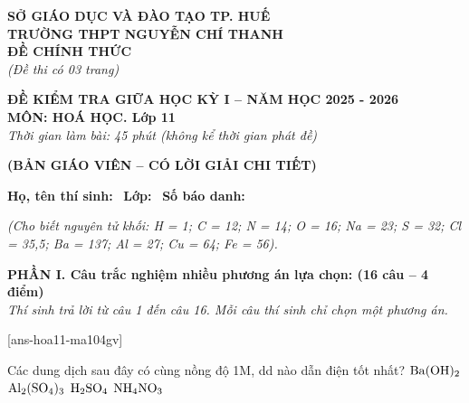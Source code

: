 \documentclass[12pt,a4paper]{article}
\begin{document}
\thispagestyle{firstpage}

\noindent
\begin{minipage}[t]{0.45\textwidth}
	\centering\fontsize{10pt}{12pt}\selectfont
	\textbf{SỞ GIÁO DỤC VÀ ĐÀO TẠO TP. HUẾ}\\
	\textbf{TRƯỜNG THPT NGUYỄN CHÍ THANH}\\
	\textbf{ĐỀ CHÍNH THỨC}\\
	\textit{(Đề thi có 03 trang)}
\end{minipage}\hfill
\begin{minipage}[t]{0.53\textwidth}
	\centering\small
	\textbf{ĐỀ KIỂM TRA GIỮA HỌC KỲ I -- NĂM HỌC 2025 - 2026}\\
	\textbf{MÔN: HOÁ HỌC. Lớp 11}\\
	\textit{Thời gian làm bài: 45 phút (không kể thời gian phát đề)}\\
\end{minipage}

\smallskip
\begin{center}
	{\color{hfRed}\textbf{\large (BẢN GIÁO VIÊN -- CÓ LỜI GIẢI CHI TIẾT)}}
\end{center}

\smallskip
\noindent\hrulefill
\smallskip

\noindent\textbf{Họ, tên thí sinh:} \dotfill\ \textbf{Lớp:} \dotfill\ \textbf{Số báo danh:} \dotfill

\smallskip
\noindent\textit{(Cho biết nguyên tử khối: H = 1; C = 12; N = 14; O = 16; Na = 23; S = 32; Cl = 35,5; Ba = 137; Al = 27; Cu = 64; Fe = 56).}
\smallskip

\noindent
\textbf{PHẦN I. Câu trắc nghiệm nhiều phương án lựa chọn: (16 câu -- 4 điểm)}\\
\textit{Thí sinh trả lời từ câu 1 đến câu 16. Mỗi câu thí sinh chỉ chọn một phương án.}

[ans-hoa11-ma104gv]

\begin{ex}
Các dung dịch sau đây có cùng nồng độ 1M, dd nào dẫn điện tốt nhất?
\choice
{$\ce{Ba(OH)2}$}
{\True $\ce{Al2(SO4)3}$}
{$\ce{H2SO4}$}
{$\ce{NH4NO3}$}
\end{ex}
\end{document}
